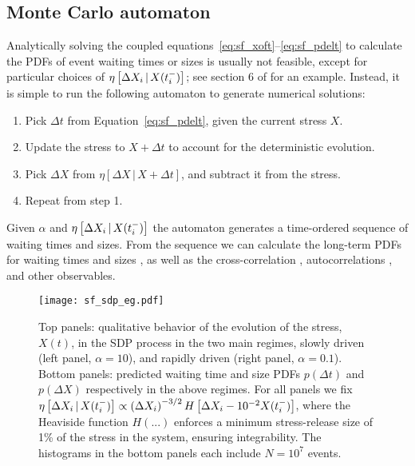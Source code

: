 \subsection{Monte Carlo automaton} \label{sec:sf_auto}
Analytically solving the coupled equations~\eqref{eq:sf_xoft}--\eqref{eq:sf_pdelt} to calculate the PDFs of event waiting times or sizes is usually not feasible, except for particular choices of $\eta\left[\Delta X_{i}\,|\,X(t_i^-)\right]$; see section 6 of \citet{Fulgenzi2017} for an example. Instead, it is simple to run the following automaton to generate numerical solutions:
\begin{enumerate}
\item Pick $\Delta t$ from Equation~\eqref{eq:sf_pdelt}, given the current stress $X$.
\item Update the stress to $X + \Delta t$ to account for the deterministic evolution.
\item Pick $\Delta X$ from $\eta\left[\Delta X \,|\, X + \Delta t \right]$, and subtract it from the stress.
\item Repeat from step 1.
\end{enumerate}
Given $\alpha$ and $\eta\left[\Delta X_{i}\,|\,X(t_i^-)\right]$ the automaton generates a time-ordered sequence of waiting times and sizes. From the sequence we can calculate the long-term PDFs for waiting times and sizes \citep{Fulgenzi2017, Carlin2019quasi}, as well as the cross-correlation \citep{Melatos2018, Carlin2019quasi}, autocorrelations \citep{Carlin2019ac}, and other observables.

\begin{figure*}
\centering
\texttt{[image: sf\_sdp\_eg.pdf]}
\caption{Top panels: qualitative behavior of the evolution of the stress, $X(t)$, in the SDP process in the two main regimes, slowly driven (left panel, $\alpha=10$), and rapidly driven (right panel, $\alpha=0.1$). Bottom panels: predicted waiting time and size PDFs $p(\Delta t)$ and $p(\Delta X)$ respectively in the above regimes. For all panels we fix $\eta\left[\Delta X_{i}\,|\,X(t_i^-)\right] \propto \left(\Delta X_{i}\right)^{-3/2}H\left[\Delta X_{i} - 10^{-2}X(t_i^-)\right]$, where the Heaviside function $H(...)$ enforces a minimum stress-release size of 1\% of the stress in the system, ensuring integrability. The histograms in the bottom panels each include $N=10^7$ events.}
\label{fig:sf_sdp}
\end{figure*}

